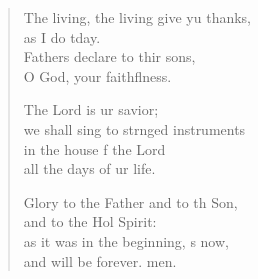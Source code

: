 \begin{verse}
\begin{patverse}
The living, the living give yu thanks,\Med\\
as I do tday.\\
Fathers declare to thir sons,\Med\\
O God, your faithflness.

The Lord is ur savior;\Med\\
we shall sing to str\pointup{\i}nged instruments\\
in the house f the Lord\Med\\
all the days of ur life.

Glory to the Father and to th Son,\Med\\
and to the Hol Spirit:\\
as it was in the beginning, \pointup{\i}s now,\Med\\
and will be forever. men. 
  \end{patverse}
\end{verse}
